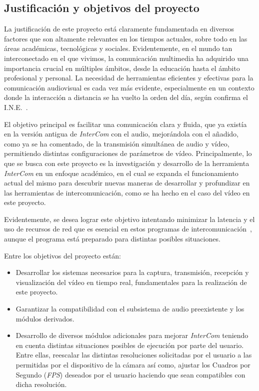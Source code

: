 \subsection{Justificación y objetivos del proyecto}
La justificación de este proyecto está claramente fundamentada en diversos factores que son altamente relevantes en los tiempos actuales, sobre todo en las áreas académicas, tecnológicas y sociales. Evidentemente, en el mundo tan interconectado en el que vivimos, la comunicación multimedia ha adquirido una importancia crucial en múltiples ámbitos, desde la educación hasta el ámbito profesional y personal. La necesidad de herramientas eficientes y efectivas para la comunicación audiovisual es cada vez más evidente, especialmente en un contexto donde la interacción a distancia se ha vuelto la orden del día, según confirma el I.N.E.~\cite{ine_informe}.
\vspace{\baselineskip}

El objetivo principal es facilitar una comunicación clara y fluida, que ya existía en la versión antigua de \textit{InterCom} con el audio, mejorándola con el añadido, como ya se ha comentado, de la transmisión simultánea de audio y vídeo, permitiendo distintas configuraciones de parámetros de vídeo. Principalmente, lo que se busca con este proyecto es la investigación y desarrollo de la herramienta \textit{InterCom} en un enfoque académico, en el cual se expanda el funcionamiento actual del mismo para descubrir nuevas maneras de desarrollar y profundizar en las herramientas de intercomunicación, como se ha hecho en el caso del vídeo en este proyecto.

\vspace{\baselineskip}
Evidentemente, se desea lograr este objetivo intentando minimizar la latencia y el uso de recursos de red que es esencial en estos programas de intercomunicación~\cite{cisco}, aunque el programa está preparado para distintas posibles situaciones.

\vspace{\baselineskip}

Entre los objetivos del proyecto están:

\begin{itemize}
	\item Desarrollar los sistemas necesarios para la captura, transmisión, recepción y visualización del vídeo en tiempo real, fundamentales para la realización de este proyecto.
	\item Garantizar la compatibilidad con el subsistema de audio preexistente y los módulos derivados.
	\item Desarrollo de diversos módulos adicionales para mejorar \textit{InterCom} teniendo en cuenta distintas situaciones posibles de ejecución por parte del usuario. Entre ellas, reescalar las distintas resoluciones solicitadas por el usuario a las permitidas por el dispositivo de la cámara así como, ajustar los Cuadros por Segundo (\textit{FPS}) deseados por el usuario haciendo que sean compatibles con dicha resolución.
\end{itemize}
\vspace{\baselineskip}


